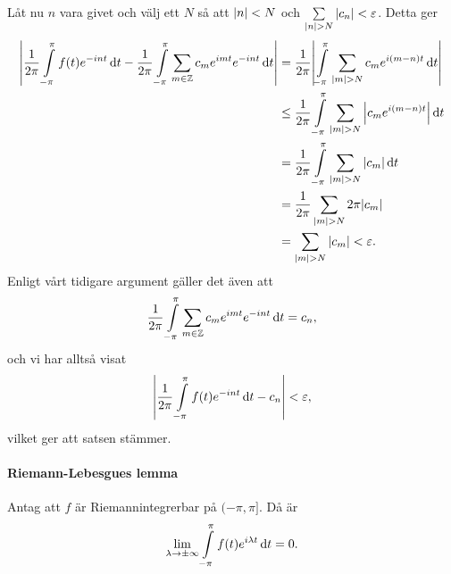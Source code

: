 Låt nu $n$ vara givet och välj ett $N$ så att $\abs{n} < N$ och $\sum\limits_{\abs{n} > N}\abs{c_{n}} < \varepsilon$. Detta ger
\begin{align*}
	\abs{\frac{1}{2\pi}\int\limits_{-\pi}^{\pi}f(t)e^{-int}\dd{t} - \frac{1}{2\pi}\int\limits_{-\pi}^{\pi}\sum\limits_{m\in\mathbb{Z}}c_{m}e^{imt}e^{-int}\dd{t}} &= \frac{1}{2\pi}\abs{\int\limits_{-\pi}^{\pi}\sum\limits_{\abs{m} > N}c_{m}e^{i(m - n)t}\dd{t}} \\
	                                      &\leq \frac{1}{2\pi}\int\limits_{-\pi}^{\pi}\sum\limits_{\abs{m} > N}\abs{c_{m}e^{i(m - n)t}}\dd{t} \\
	                                      &= \frac{1}{2\pi}\int\limits_{-\pi}^{\pi}\sum\limits_{\abs{m} > N}\abs{c_{m}}\dd{t} \\
	                                      &= \frac{1}{2\pi}\sum\limits_{\abs{m} > N}2\pi\abs{c_{m}} \\
	                                      &= \sum\limits_{\abs{m} > N}\abs{c_{m}} < \varepsilon.
\end{align*}
Enligt vårt tidigare argument gäller det även att
\begin{align*}
	\frac{1}{2\pi}\int\limits_{-\pi}^{\pi}\sum\limits_{m\in\mathbb{Z}}c_{m}e^{imt}e^{-int}\dd{t} = c_{n},
\end{align*}
och vi har alltså visat
\begin{align*}
	\abs{\frac{1}{2\pi}\int\limits_{-\pi}^{\pi}f(t)e^{-int}\dd{t} - c_{n}} < \varepsilon,
\end{align*}
vilket ger att satsen stämmer.

\paragraph{Riemann-Lebesgues lemma}
Antag att $f$ är Riemannintegrerbar på $(-\pi, \pi]$. Då är
\begin{align*}
	\lim\limits_{\lambda\to\pm\infty}\int\limits_{-\pi}^{\pi}f(t)e^{i\lambda t}\dd{t} = 0.
\end{align*}


